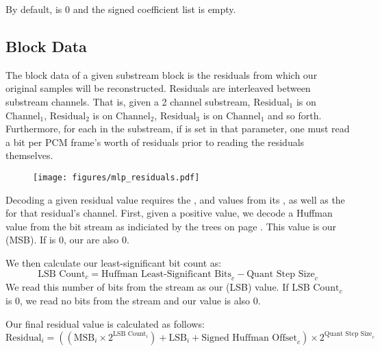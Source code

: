 By default,  is 0 and the signed coefficient list is empty.

\clearpage

\subsection{Block Data}

The block data of a given substream block is the residuals
from which our original samples will be reconstructed.
Residuals are interleaved between substream channels.
That is, given a 2 channel substream, $\text{Residual}_1$ is
on $\text{Channel}_1$, $\text{Residual}_2$ is on $\text{Channel}_2$,
$\text{Residual}_3$ is on $\text{Channel}_1$ and so forth.
Furthermore, for each  in the substream,
if  is set in that parameter,
one must read a  bit per PCM frame's worth of
residuals prior to reading the residuals themselves.

\begin{figure}[h]
\texttt{[image: figures/mlp\_residuals.pdf]}
\end{figure}

Decoding a given residual value requires the
,  and
 values from its ,
as well as the  for that residual's channel.
First, given a positive  value, we decode a Huffman value
from the bit stream as indiciated by the trees on page
\pageref{mlp_codebooks}.
This value is our  (MSB).
If  is 0, our  are also 0.

We then calculate our least-significant bit count as:
\begin{equation*}
\text{LSB Count}_c = \text{Huffman Least-Significant Bits}_c - \text{Quant Step Size}_c
\end{equation*}
We read this number of bits from the stream as
our  (LSB) value.
If $\text{LSB Count}_c$ is 0, we read no bits from the stream and our
 value is also 0.

Our final residual value is calculated as follows:
\begin{equation*}
\text{Residual}_i = ((\text{MSB}_i \times 2 ^ {\text{LSB Count}_i}) + \text{LSB}_i + \text{Signed Huffman Offset}_c) \times 2 ^ {\text{Quant Step Size}_c}
\end{equation*}

